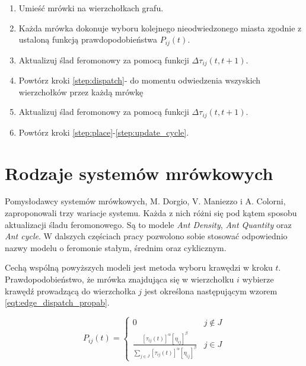 {{        \begin{enumerate}
            \item \label{step:place} Umieść mrówki na wierzchołkach grafu.
            \item \label{step:dispatch} Każda mrówka dokonuje wyboru kolejnego nieodwiedzonego miasta zgodnie z ustaloną
            funkcją prawdopodobieństwa $P_{ij}(t)$.
            \item \label{step:update} Aktualizuj ślad feromonowy za pomocą funkcji $\Delta\tau_{ij}(t, t+1)$.
            \item Powtórz kroki \ref{step:dispatch}-\label{step:update} do momentu odwiedzenia wszyskich wierzchołków
            przez każdą mrówkę
            \item \label{step:update_cycle} Aktualizuj ślad feromonowy za pomocą funkcji $\Delta\tau_{ij}(t, t+1)$.
            \item Powtórz kroki \ref{step:place}-\ref{step:update_cycle}.
        \end{enumerate}
    }

    \section{Rodzaje systemów mrówkowych}
    {
        Pomysłodawcy systemów mrówkowych, M. Dorgio, V. Maniezzo i A. Colorni, zaproponowali trzy wariacje systemu.
        Każda z nich różni się pod kątem sposobu aktualizacji śladu feromonowego. Są to modele \textit{Ant Density},
        \textit{Ant Quantity} oraz \textit{Ant cycle}. W dalszych częściach pracy pozwolono sobie stosować odpowiednio
        nazwy modelu o feromonie stałym, średnim oraz cyklicznym.

        Cechą wspólną powyższych modeli jest metoda wyboru krawędzi w kroku $t$. Prawdopodobieństwo, że mrówka
        znajdująca się w wierzchołku $i$ wybierze krawędź prowadzącą do wierzchołka $j$ jest określona następującym
        wzorem \ref{eqt:edge_dispatch_propab}.

        \begin{equation}\label{eqt:edge_dispatch_propab}
            P_{ij}(t) = \left\{\begin{matrix}
                0 & j \not\in J\\
                \frac{[\tau_{ij}(t)]^\alpha [\eta_{ij}]^\beta}{\sum_{j\in J} {[\tau_{ij}(t)]^\alpha [\eta_{ij}]^\beta} } & j \in J
                \end{matrix}\right.
        \end{equation}

}}
